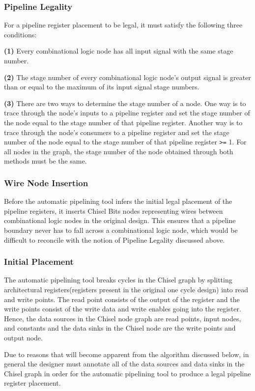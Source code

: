 \subsubsection{Pipeline Legality}
For a pipeline register placement to be legal, it must satisfy the following three conditions:

{\bf (1)} Every combinational logic node has all input signal with the same stage number.  

{\bf (2)} The stage number of every combinational logic node's output signal is greater than or equal to the maximum of its input signal stage numbers. 

{\bf (3)} There are two ways to determine the stage number of a node. One way is to trace through the node's inputs to a pipeline register and set the stage number of the node equal to the stage number of that pipeline register. Another way is to trace through the node’s consumers to a pipeline register and set the stage number of the node equal to the stage number of that pipeline register {\tt >=}  1. For all nodes in the graph, the stage number of the node obtained through both methods must be the same.

\subsubsection{Wire Node Insertion}
\label{wiresection}
Before the automatic pipelining tool infers the initial legal placement of the pipeline registers, it inserts Chisel Bits nodes representing wires between combinational logic nodes in the original design. This ensures that a pipeline boundary never has to fall across a combinational logic node, which would be difficult to reconcile with the notion of Pipeline Legality discussed above.
\subsubsection{Initial Placement}
The automatic pipelining tool breaks cycles in the Chisel graph by splitting architectural registers(registers present in the original one cycle design) into read and write points. The read point consists of the output of the register and the write points consist of the write data and write enables going into the register. Hence, the data sources in the Chisel node graph are read points, input nodes, and constants and the data sinks in the Chisel node are the write points and output node.

Due to reasons that will become apparent from the algorithm discussed below, in general the designer must annotate all of the data sources and data sinks in the Chisel graph in order for the automatic pipelining tool to produce a legal pipeline register placement.

